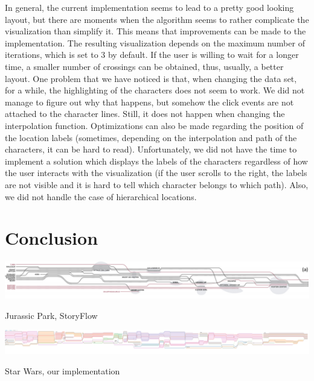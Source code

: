 \documentclass{report}
\begin{document}
In general, the current implementation seems to lead to a pretty good looking layout, but there are moments when the algorithm seems to rather complicate the visualization than simplify it. This means that improvements can be made to the implementation. The resulting visualization depends on the maximum number of iterations, which is set to 3 by default. If the user is willing to wait for a longer time, a smaller number of crossings can be obtained, thus, usually, a better layout. One problem that we have noticed is that, when changing the data set, for a while, the highlighting of the characters does not seem to work. We did not manage to figure out why that happens, but somehow the click events are not attached to the character lines. Still, it does not happen when changing the interpolation function.
Optimizations can also be made regarding the position of the location labels (sometimes, depending on the interpolation and path of the characters, it can be hard to read). Unfortunately, we did not have the time to implement a solution which displays the labels of the characters regardless of how the user interacts with the visualization (if the user scrolls to the right, the labels are not visible and it is hard to tell which character belongs to which path).
Also, we did not handle the case of hierarchical locations.

\chapter{Conclusion}
\par
\centerline{\includegraphics[width=\textwidth]{jurassic_park}}
\par
\begin{center}
Jurassic Park, StoryFlow
\end{center}
\centerline{\includegraphics[width=\textwidth]{after_overview}}
\par
\begin{center}
Star Wars, our implementation
\end{center}
\end{document}
